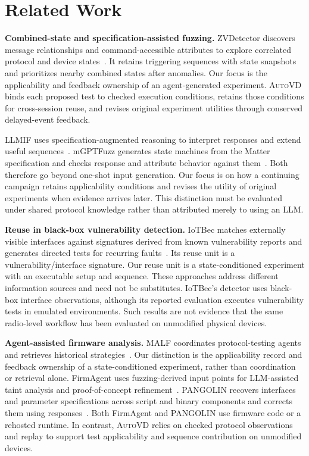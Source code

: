 \documentclass[10pt,journal,compsoc]{IEEEtran}
\newcommand{\system}{\textsc{AutoVD}}
\newcommand{\parab}[1]{\vspace{0.04in}\noindent\textbf{#1}}
\begin{document}
\section{Related Work}\label{sec:related-work}
\parab{Combined-state and specification-assisted fuzzing.}
ZVDetector discovers message relationships and command-accessible attributes to explore correlated protocol and device states~\cite{zvdetector}. It retains triggering sequences with state snapshots and prioritizes nearby combined states after anomalies. Our focus is the applicability and feedback ownership of an agent-generated experiment. \system{} binds each proposed test to checked execution conditions, retains those conditions for cross-session reuse, and revises original experiment utilities through conserved delayed-event feedback.

LLMIF uses specification-augmented reasoning to interpret responses and extend useful sequences~\cite{llmif}. mGPTFuzz generates state machines from the Matter specification and checks response and attribute behavior against them~\cite{mgptfuzz}. Both therefore go beyond one-shot input generation. Our focus is on how a continuing campaign retains applicability conditions and revises the utility of original experiments when evidence arrives later. This distinction must be evaluated under shared protocol knowledge rather than attributed merely to using an LLM.

\parab{Reuse in black-box vulnerability detection.}
IoTBec matches externally visible interfaces against signatures derived from known vulnerability reports and generates directed tests for recurring faults~\cite{iotbec}. Its reuse unit is a vulnerability/interface signature. Our reuse unit is a state-conditioned experiment with an executable setup and sequence. These approaches address different information sources and need not be substitutes. IoTBec's detector uses black-box interface observations, although its reported evaluation executes vulnerability tests in emulated environments. Such results are not evidence that the same radio-level workflow has been evaluated on unmodified physical devices.

\parab{Agent-assisted firmware analysis.}
MALF coordinates protocol-testing agents and retrieves historical strategies~\cite{malf}. Our distinction is the applicability record and feedback ownership of a state-conditioned experiment, rather than coordination or retrieval alone. FirmAgent uses fuzzing-derived input points for LLM-assisted taint analysis and proof-of-concept refinement~\cite{firmagent}. PANGOLIN recovers interfaces and parameter specifications across script and binary components and corrects them using responses~\cite{pangolin}. Both FirmAgent and PANGOLIN use firmware code or a rehosted runtime. In contrast, \system{} relies on checked protocol observations and replay to support test applicability and sequence contribution on unmodified devices.
\end{document}
